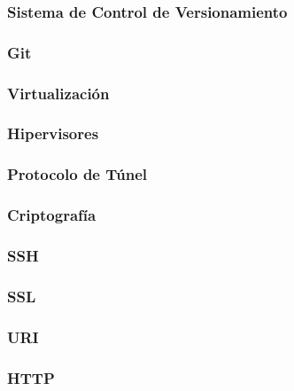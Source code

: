 \subsubsection{Sistema de Control de Versionamiento}
\subsubsection{Git}

\subsubsection{Virtualización}
\subsubsection{Hipervisores}

\subsubsection{Protocolo de Túnel}

\subsubsection{Criptografía}

\subsubsection{SSH}

\subsubsection{SSL}

\subsubsection{URI}

\subsubsection{HTTP}
